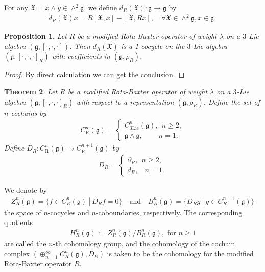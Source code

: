 \documentclass[12pt]{amsart}
\newtheorem{theorem}{Theorem}[section]
\newtheorem{prop}[theorem]{Proposition}
\theoremstyle{definition}
\begin{document}
For any $\mathfrak{X}=x\wedge y\in \wedge^2 \mathfrak{g}$, we define $d_R(\mathfrak{X}) : \mathfrak{g}\rightarrow \mathfrak{g}$ by
\begin{eqnarray*}
d_R(\mathfrak{X})x=R[\mathfrak{X}, x]-[\mathfrak{X}, Rx], \quad \forall \mathfrak{X}\in \wedge^2\mathfrak{g}, x\in \mathfrak{g},
\end{eqnarray*}
\begin{prop}
Let $R$ be a modified Rota-Baxter operator of weight $\lambda$ on a $3$-Lie algebra $(\mathfrak{g}, [\cdot, \cdot, \cdot])$. Then $d_R(\mathfrak{X})$ is a 1-cocycle on the $3$-Lie algebra $(\mathfrak{g}, [\cdot, \cdot, \cdot]_R)$ with coefficients in $(\mathfrak{g}, \rho_R)$.
\end{prop}
\begin{proof}
By direct calculation we can get the conclusion.
\end{proof}
\begin{theorem}\label{Thm: cohomology of modified RB 3 Lie}
Let $R$ be a modified Rota-Baxter operator of weight $\lambda$ on a $3$-Lie algebra $(\mathfrak{g}, [\cdot, \cdot, \cdot]_R)$ with respect to a representation $(\mathfrak{g},  \rho_R)$. Define the set of $n$-cochains by
\begin{align*}
C^n_{\mathrm{R}}(\mathfrak{g} )=
\begin{cases}
C^n_{\mathrm{3Lie}}(\mathfrak{g}), ~~n\geq 2,\\
\mathfrak{g}\wedge \mathfrak{g}, ~~~~~~~~~~ n=1.
\end{cases}
\end{align*}
Define $D_R: C^n_{\mathrm{R}}(\mathfrak{g})\rightarrow C^{n+1}_{\mathrm{R}}(\mathfrak{g} )$ by
\begin{align*}
D_R=
\begin{cases}
\partial_R, ~~n\geq 2,\\
d_R, ~~~~ n=1.
\end{cases}
\end{align*}
\end{theorem}
We denote by
\begin{align*}
    Z^n_R (\mathfrak{g}) = \{ f \in C^n_R (\mathfrak{g}) ~|~ D_R f = 0 \} ~~~ \text{ and } ~~~
    B^n_R (\mathfrak{g}) = \{ D_R g ~|~ g \in C^{n-1}_R(\mathfrak{g}) \}
\end{align*}
the space of $n$-cocycles and $n$-coboundaries, respectively.
The corresponding quotients
\begin{align*}
    H^n_R (\mathfrak{g}) :=   Z^n_R (\mathfrak{g})  /B^n_R (\mathfrak{g}), \text{ for } n \geq 1
\end{align*}
are called the $n$-th cohomology group,  and the cohomology of the cochain complex
$(\oplus_{n=1}^{\infty}C^n_R(\mathfrak{g}), D_R)$ is taken to be the cohomology for the modified Rota-Baxter operator $R$.
\end{document}
